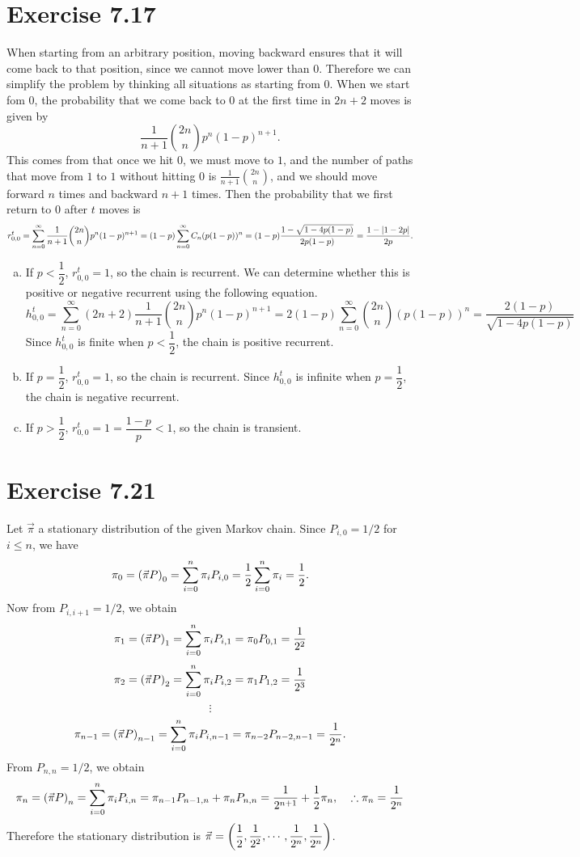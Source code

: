 \documentclass{article}
\begin{document}
\section*{Exercise 7.17}
When starting from an arbitrary position, moving backward ensures that it will come back to that position, since we cannot move lower than $0$. 
Therefore we can simplify the problem by thinking all situations as starting from $0$.
When we start fom $0$, the probability that we come back to $0$ at the first time in $2n+2$ moves is given by
$$\frac{1}{n+1}{2n \choose n}p^n(1-p)^{n+1}.$$
This comes from that once we hit $0$, we must move to $1$, and the number of paths that move from $1$ to $1$ without hitting $0$ is $\displaystyle \frac{1}{n+1}{2n \choose n}$, and we should move forward $n$ times and backward $n+1$ times.
Then the probability that we first return to $0$ after $t$ moves is
$$r_{0, 0}^{t} = \sum_{n=0}^{\infty}\frac{1}{n+1}{2n \choose n}p^n(1-p)^{n+1} = (1-p)\sum_{n=0}^{\infty}C_n(p(1-p))^n = (1-p)\frac{1 - \sqrt{1 - 4p(1-p)}}{2p(1-p)} = \frac{1 - \qty|1-2p|}{2p}.$$
\begin{enumerate}[(a)]
    \item If $p < \dfrac{1}{2}$, $r_{0, 0}^t = 1$, so the chain is recurrent.
    We can determine whether this is positive or negative recurrent using the following equation. 
    $$h_{0, 0}^t = \sum_{n=0}^{\infty}(2n+2)\frac{1}{n+1}{2n \choose n}p^n(1-p)^{n+1} = 2(1-p)\sum_{n=0}^{\infty}{2n \choose n}(p(1-p))^n = \frac{2(1-p)}{\sqrt{1 - 4p(1-p)}}$$
    Since $h_{0, 0}^t$ is finite when $p < \dfrac{1}{2}$, the chain is positive recurrent.
    \item If $p = \dfrac{1}{2}$, $r_{0, 0}^t = 1$, so the chain is recurrent.
    Since $h_{0, 0}^t$ is infinite when $p = \dfrac{1}{2}$, the chain is negative recurrent.
    \item If $p > \dfrac{1}{2}$, $r_{0, 0}^t = 1 = \dfrac{1-p}{p} < 1$, so the chain is transient.
\end{enumerate}

\section*{Exercise 7.21}
Let $\vec{\pi}$ a stationary distribution of the given Markov chain.  
Since $P_{i, 0} = 1/2$ for $i \leq n$, we have
$${\pi}_{0} = \qty(\vec{\pi}P)_{0} = \sum_{i=0}^{n}{\pi}_iP_{i, 0} = \frac{1}{2}\sum_{i=0}^{n}\pi_i = \frac{1}{2}.$$
Now from $P_{i, i+1} = 1/2$, we obtain
$$\pi_1 = \qty(\vec{\pi}P)_{1} = \sum_{i=0}^{n}{\pi}_iP_{i, 1} = \pi_0P_{0, 1} = \frac{1}{2^2}$$
$$\pi_2 = \qty(\vec{\pi}P)_{2} = \sum_{i=0}^{n}{\pi}_iP_{i, 2} = \pi_1P_{1, 2} = \frac{1}{2^3}$$
$$\vdots$$
$$\pi_{n-1} = \qty(\vec{\pi}P)_{n-1} = \sum_{i=0}^{n}{\pi}_iP_{i, n-1} = \pi_{n-2}P_{n-2, n-1} = \frac{1}{2^n}.$$
From $P_{n, n} = 1/2$, we obtain
$$\pi_{n} = \qty(\vec{\pi}P)_{n} = \sum_{i=0}^{n}{\pi}_iP_{i, n} = \pi_{n-1}P_{n-1, n} + \pi_{n}P_{n, n} = \frac{1}{2^{n+1}} + \frac{1}{2}\pi_n, \;\;\;\; \therefore \pi_n = \frac{1}{2^n}$$
Therefore the stationary distribution is $\vec{\pi} = \qty(\dfrac{1}{2}, \dfrac{1}{2^2}, \cdots, \dfrac{1}{2^n}, \dfrac{1}{2^n})$.
\end{document}
